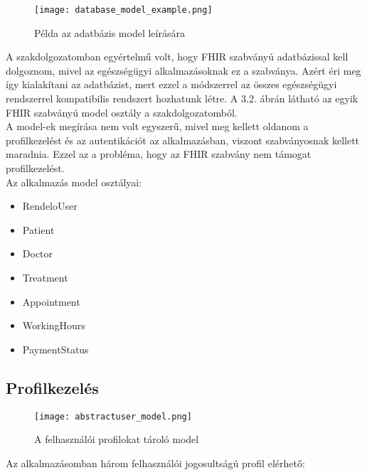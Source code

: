 \begin{figure}[!htbp]
	\caption{Példa az adatbázis model leírására}
	\label{fig:adatbazismodell}
	\centering
	\texttt{[image: database\_model\_example.png]}
\end{figure}

A szakdolgozatomban egyértelmű volt, hogy FHIR szabványú adatbázissal kell dolgoznom, mivel az egészségügyi alkalmazásoknak ez a szabványa. Azért éri meg így kialakítani az adatbázist, mert ezzel a módszerrel az összes egészségügyi rendszerrel kompatibilis rendszert hozhatunk létre. A 3.2. ábrán látható az egyik FHIR szabványú model osztály a szakdolgozatomból.\\
A model-ek megírása nem volt egyszerű, mivel meg kellett oldanom a profilkezelést és az autentikációt az alkalmazásban, viszont szabványosnak kellett maradnia. Ezzel az a probléma, hogy az FHIR szabvány nem támogat profilkezelést.\\
Az alkalmazás model osztályai:
\begin{itemize}
	\item RendeloUser
	\item Patient
	\item Doctor
	\item Treatment
	\item Appointment
	\item WorkingHours
	\item PaymentStatus
\end{itemize}

\subsection{Profilkezelés}

\begin{figure}[!htbp]
	\caption{A felhasználói profilokat tároló model}
	\label{fig:profilmodell}
	\centering
	\texttt{[image: abstractuser\_model.png]}
\end{figure}

Az alkalmazásomban három felhasználói jogosultságú profil elérhető:

